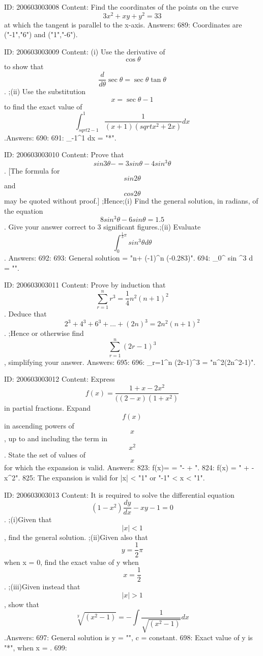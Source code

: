 \documentclass{article}
\begin{document}
ID: 200603003008
Content:
Find the coordinates of the points on the curve $$3x^{2}+xy+y^{2}=33$$ at which the tangent is parallel to the x-axis. Answers:
689: Coordinates are ("-1","6") and ("1","-6").

ID: 200603003009
Content:
(i) Use the derivative of $$\cos \theta $$ to show that $$\frac{d}{d \theta} \sec \theta = \sec \theta \tan \theta$$. ;(ii) Use the substitution $$x=\sec \theta-1$$ to find the exact value of $$\int_{sqrt{2-1}}^{1} \frac{1}{(x+1)( sqrt{x^{2}+2x})} dx$$.Answers:
690: 
691: \int_{-1}^{1}  dx = "*\pi".

ID: 200603003010
Content:
Prove that $$ sin 3 \theta  -= 3 sin \theta-4 sin^{3} \theta$$. [The formula for $$ sin 2 \theta$$ and $$ cos 2 \theta$$ may be quoted without proof.]  ;Hence;(i) Find the general solution, in radians, of the equation $$8 sin ^3 \theta - 6 sin \theta =1.5$$. Give your answer correct to 3 significant figures.;(ii) Evaluate $$ \int_{0}^{ \frac{1}{3} \pi  } sin ^3 \theta d \theta $$. Answers:
692: 
693: General solution = "n\pi + (-1)^n (-0.283)".
694:  \int_{0}^{  \pi  } sin ^3 \theta d \theta  = "".

ID: 200603003011
Content:
Prove by induction that $$ \sum_{r=1}^{n}r^{3}= \frac{1}{4} n^{2}(n+1)^{2}$$. Deduce that $$2^{3}+4^{3}+6^{3}+...+(2n)^{3}=2n^{2}(n+1)^{2}$$. ;Hence or otherwise find $$ \sum_{r=1}^{n} (2r-1)^3$$, simplifying your answer. Answers:
695: 
696:  \sum_{r=1}^{n} (2r-1)^3 = "n^2(2n^2-1)".

ID: 200603003012
Content:
Express $$f(x)= \frac{1+x-2x^{2}}{((2-x)(1+x^{2})} $$ in partial fractions. Expand $$f(x)$$ in ascending powers of $$x$$, up to and including the term in $$x^{2} $$. State the set of values of $$x$$ for which the expansion is valid.  Answers:
823: f(x)=   = "- + ".
824: f(x) = " +  - x^2".
825: The expansion is valid for |x| < "1" or "-1" < x < "1".

ID: 200603003013
Content:
It is required to solve the differential equation $$(1-x^{2})\frac{dy}{dx}-xy-1=0$$. ;(i)Given that $$|x|<1$$, find the general solution. ;(ii)Given also that $$y= \frac{1}{2} \pi $$ when x = 0, find the exact value of y when $$x= \frac{1}{2} $$. ;(iii)Given instead that $$|x|>1$$, show that $$ \sqrt[y]{(x^{2}-1)} =- \int \frac{1}{\sqrt{(x^{2}-1)}} dx$$.Answers:
697: General solution is y = "", c = constant.
698: Exact value of y is "*\pi", when x = .
699: 
\end{document}

